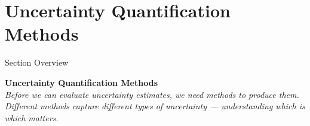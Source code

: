 \documentclass[aspectratio=169]{beamer}
\begin{document}
\section{Uncertainty Quantification Methods}
\begin{frame}{Section Overview}
  \begin{center}
    \Large \textbf{Uncertainty Quantification Methods}\\[1em]
    \normalsize
    \textit{Before we can evaluate uncertainty estimates, we need methods to produce them.\\
    Different methods capture different types of uncertainty — understanding which is which matters.}
  \end{center}
\end{frame}
\end{document}
